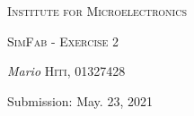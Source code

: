 \documentclass[11pt,a4paper]{article}
\begin{document}
\begin{titlepage}
	\centering
	\begin{center}
	\end{center}
	{\scshape\LARGE  Institute for Microelectronics\par}
	\vspace{1cm}
	{\scshape\Large SimFab - Exercise 2\par}
	\vspace{1.5cm}
	\vspace{2cm}
	{\Large\textit{Mario} \textsc{Hiti, 01327428}\par}
	\vspace{1.5cm}
	Submission: May. 23, 2021

\end{titlepage}


\tableofcontents 


\thispagestyle{empty}
\newpage
\setcounter{page}{1}



   
   
\end{document}
